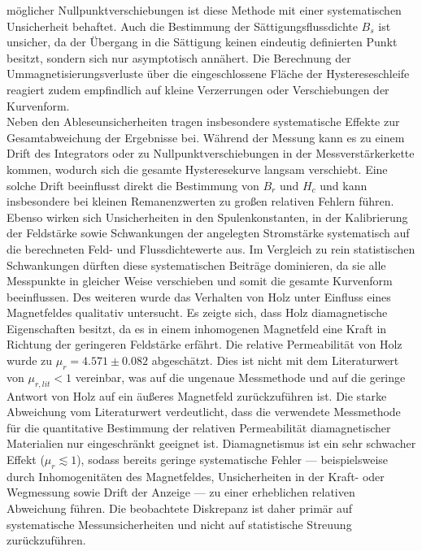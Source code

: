 möglicher Nullpunktverschiebungen ist diese Methode mit einer
systematischen Unsicherheit behaftet. 
Auch die Bestimmung der Sättigungsflussdichte \( B_s \) ist
unsicher, da der Übergang in die Sättigung keinen eindeutig
definierten Punkt besitzt, sondern sich nur asymptotisch annähert.
Die Berechnung der Ummagnetisierungsverluste über die eingeschlossene
Fläche der Hystereseschleife reagiert zudem empfindlich auf kleine
Verzerrungen oder Verschiebungen der Kurvenform.\\
Neben den Ableseunsicherheiten tragen insbesondere systematische
Effekte zur Gesamtabweichung der Ergebnisse bei. Während der
Messung kann es zu einem Drift des Integrators oder zu
Nullpunktverschiebungen in der Messverstärkerkette kommen,
wodurch sich die gesamte Hysteresekurve langsam verschiebt.
Eine solche Drift beeinflusst direkt die Bestimmung von
\( B_r \) und \( H_c \) und kann insbesondere bei kleinen
Remanenzwerten zu großen relativen Fehlern führen.
Ebenso wirken sich Unsicherheiten in den Spulenkonstanten,
in der Kalibrierung der Feldstärke sowie Schwankungen der
angelegten Stromstärke systematisch auf die berechneten
Feld- und Flussdichtewerte aus. Im Vergleich zu rein
statistischen Schwankungen dürften diese systematischen
Beiträge dominieren, da sie alle Messpunkte in gleicher
Weise verschieben und somit die gesamte Kurvenform beeinflussen.
Des weiteren wurde das Verhalten von Holz unter Einfluss eines Magnetfeldes qualitativ untersucht.
Es zeigte sich, dass Holz diamagnetische Eigenschaften besitzt, da es in einem inhomogenen
Magnetfeld eine Kraft in Richtung der geringeren Feldstärke erfährt.
Die relative Permeabilität von Holz wurde zu $\mu_r = 4.571 \pm 0.082$ abgeschätzt. Dies ist nicht mit dem Literaturwert von
$\mu_{r,lit} < 1$ \cite{Holz} vereinbar, was auf die ungenaue Messmethode und auf die geringe Antwort von Holz
auf ein äußeres Magnetfeld zurückzuführen ist. 
Die starke Abweichung vom Literaturwert verdeutlicht, dass die
verwendete Messmethode für die quantitative Bestimmung der
relativen Permeabilität diamagnetischer Materialien nur eingeschränkt
geeignet ist. Diamagnetismus ist ein sehr schwacher Effekt
(\( \mu_r \lesssim 1 \)), sodass bereits geringe systematische
Fehler — beispielsweise durch Inhomogenitäten des Magnetfeldes,
Unsicherheiten in der Kraft- oder Wegmessung sowie Drift der
Anzeige — zu einer erheblichen relativen Abweichung führen.
Die beobachtete Diskrepanz ist daher primär auf systematische
Messunsicherheiten und nicht auf statistische Streuung
zurückzuführen.
